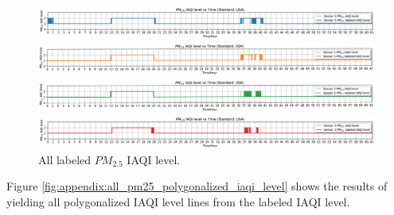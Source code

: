 \begin{figure}[!htbp]
    \begin{center}
        \includegraphics[width=\linewidth]{fig/labeled_iaqi_level/origin_and_labeled/pm25_0.png}
    \end{center}
    \begin{center}
        \includegraphics[width=\linewidth]{fig/labeled_iaqi_level/origin_and_labeled/pm25_1.png}
    \end{center}
    \begin{center}
        \includegraphics[width=\linewidth]{fig/labeled_iaqi_level/origin_and_labeled/pm25_2.png}
    \end{center}
    \begin{center}
        \includegraphics[width=\linewidth]{fig/labeled_iaqi_level/origin_and_labeled/pm25_3.png}
    \end{center}
    \caption{All labeled $PM_{2.5}$ IAQI level.}
    \label{fig:appendix:all_pm25_iaqi_level_and_labeled}
\end{figure}

Figure \ref{fig:appendix:all_pm25_polygonalized_iaqi_level} shows the results of yielding all polygonalized IAQI level lines from the labeled IAQI level.

